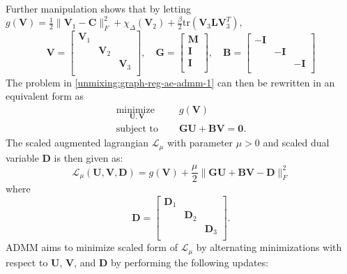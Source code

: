 Further manipulation shows that by letting
$
g(\mathbf{V}) = \frac{1}{2} \|\mathbf{V}_1 - \mathbf{C} \|_F^2 + \chi_{\Delta}(\mathbf{V}_2) + \frac{\beta}{2}\text{tr}(\mathbf{V}_3 \mathbf{L} \mathbf{V}_3^T),
$
$$
\mathbf{V} = \begin{bmatrix}
\mathbf{V}_1 &  &   \\
 &\mathbf{V}_2&   \\
  &  & \mathbf{V}_3 \\
\end{bmatrix},
\quad
\mathbf{G} = 
\begin{bmatrix}
\mathbf{M}\\ 
\mathbf{I}\\ 
\mathbf{I}\\ 
\end{bmatrix},
\quad
\mathbf{B} = 
\begin{bmatrix}
-\mathbf{I} &  &  \\
  &-\mathbf{I}&  \\
&  & -\mathbf{I} \\
\end{bmatrix}
$$
The problem in \eqref{unmixing:graph-reg-ae-admm-1} can then be rewritten in an equivalent form as
\begin{equation}
    \label{unmixing:graph-reg-ae-admm-2}
    \begin{aligned}
        \underset{\mathbf{U},\mathbf{V}}{\text{minimize }} & \quad g(\mathbf{V})
        \\         
        \text{subject to } &  \quad \mathbf{GU} + \mathbf{BV} = \mathbf{0}.
   \end{aligned}
\end{equation}
The scaled augmented lagrangian $\mathcal{L}_\mu$ with parameter $\mu > 0$ and scaled dual variable $\mathbf{D}$ is then given as:
\begin{equation}
  \label{admm:lagrangian-ae}
  \mathcal{L}_{\mu}(\mathbf{U}, \mathbf{V}, \mathbf{D}) = g(\mathbf{V}) + \frac{\mu}{2} \|\mathbf{GU} + \mathbf{BV} - \mathbf{D}\|_F^2
\end{equation}
where
$$
\mathbf{D} = 
\begin{bmatrix}
\mathbf{D}_1 &  &  \\
  &\mathbf{D}_2&  \\
&  & \mathbf{D}_3 \\
\end{bmatrix}.
$$
ADMM aims to minimize scaled form of $\mathcal{L}_{\mu}$ by alternating minimizations with respect to $\mathbf{U}$, $\mathbf{V}$, and $\mathbf{D}$ by performing the following updates:

